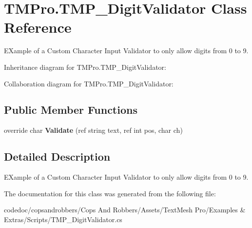 \hypertarget{classTMPro_1_1TMP__DigitValidator}{}\section{T\+M\+Pro.\+T\+M\+P\+\_\+\+Digit\+Validator Class Reference}
\label{classTMPro_1_1TMP__DigitValidator}


E\+Xample of a Custom Character Input Validator to only allow digits from 0 to 9.  




Inheritance diagram for T\+M\+Pro.\+T\+M\+P\+\_\+\+Digit\+Validator\+:


Collaboration diagram for T\+M\+Pro.\+T\+M\+P\+\_\+\+Digit\+Validator\+:
\subsection*{Public Member Functions}
\begin{DoxyCompactItemize}
\item 
\mbox{\label{classTMPro_1_1TMP__DigitValidator_aee9e46839d4adef308831e5fcba40b0e}} 
override char {\bfseries Validate} (ref string text, ref int pos, char ch)
\end{DoxyCompactItemize}


\subsection{Detailed Description}
E\+Xample of a Custom Character Input Validator to only allow digits from 0 to 9. 



The documentation for this class was generated from the following file\+:\begin{DoxyCompactItemize}
\item 
codedoc/copsandrobbers/\+Cops And Robbers/\+Assets/\+Text\+Mesh Pro/\+Examples \& Extras/\+Scripts/T\+M\+P\+\_\+\+Digit\+Validator.\+cs\end{DoxyCompactItemize}
